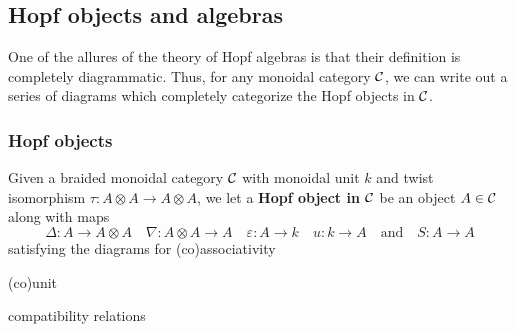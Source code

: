 \documentclass[12pt]{article}
\begin{document}
\subsection{Hopf objects and algebras}
One of the allures of the theory of Hopf algebras is that their definition is completely diagrammatic. Thus, for any monoidal category $\mathcal{C}$, we can write out a series of diagrams which completely categorize the Hopf objects in $\mathcal{C}$.

\subsubsection{Hopf objects}
Given a braided monoidal category $\mathcal{C}$ with monoidal unit $k$ and twist isomorphism $\tau:A\otimes A\to A\otimes A$, we let a \textbf{Hopf object in $\mathcal{C}$} be an object $A\in\mathcal{C}$ along with maps
\[\Delta:A\to A\otimes A\quad \nabla:A\otimes A\to A\quad \varepsilon:A\to k\quad u:k\to A\quad\text{and}\quad S:A\to A\]
satisfying the diagrams for (co)associativity
\begin{center}
    \qquad
\end{center}
(co)unit
\begin{center}
    \qquad
\end{center}
compatibility relations
\begin{center}
\end{center}
\end{document}
